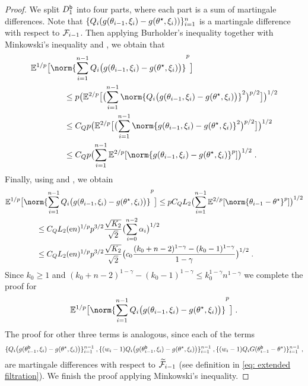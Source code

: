\begin{proof}
    We split \( D^{\mathsf{b}}_{1} \) into four parts, where each part is a sum of martingale differences.
    Note that $\{Q_i(g(\theta_{i-1},\xi_i)-g(\theta^\star,\xi_i))\}_{i=1}^{n}$ is a martingale difference with respect to $\mathcal{F}_{i-1}$.
    Then applying Burholder's inequality \cite[Theorem 8.6]{oskekowski2012sharp} together with Minkowski's inequality and , we obtain that 
    \begin{align}   
    &\PE^{1/p}\bigl[\norm{\sum_{i=1}^{n-1}Q_i\bigl(g(\theta_{i-1},\xi_i)-g(\thetas,\xi_i) \bigr)}^{p}\bigr] \\ 
    &\qquad \qquad \leq p\bigl(\PE^{2/p}\bigl[\bigl( \sum_{i=1}^{n-1}\norm{Q_i\bigl(g(\theta_{i-1},\xi_i)-g(\thetas,\xi_i) \bigr)}^2\bigr)^{p/2}\bigr]\bigr)^{1/2}
    \\ 
    &\qquad \qquad \leq C_Qp\bigl(\PE^{2/p}\bigl[\bigl( \sum_{i=1}^{n-1}\norm{g(\theta_{i-1},\xi_i)-g(\thetas,\xi_i)}^2\bigr)^{p/2}\bigr]\bigr)^{1/2}\\ 
    &\qquad \qquad \leq C_Qp\bigl(\sum_{i=1}^{n-1}\PE^{2/p}[\norm{g(\theta_{i-1},\xi_i)-g(\thetas,\xi_i) }^{p}]\bigr)^{1/2}\eqsp.
    \end{align}
Finally, using  and , we obtain 
\begin{align}
&\PE^{1/p}\bigl[\norm{\sum_{i=1}^{n-1}Q_i\bigl(g(\theta_{i-1},\xi_i)-g(\thetas,\xi_i) \bigr)}^{p}\bigr] \leq pC_QL_2\bigl(\sum_{i=1}^{n-1}\PE^{2/p}[\norm{\theta_{i-1} -\thetas}^{p}]\bigr)^{1/2}\\ 
& \qquad \qquad \leq  C_QL_2(\rme n)^{1/p}p^{3/2}\frac{\sqrt{K_2}}{\sqrt{2}}\bigl(\sum_{i=0}^{n-2}\alpha_i\bigr)^{1/2} \\
& \qquad \qquad \leq  C_QL_2(\rme n)^{1/p}p^{3/2}\frac{\sqrt{K_2}}{\sqrt{2}}\bigl(c_0\frac{(k_0+n-2)^{1-\gamma}-(k_0-1)^{1-\gamma}}{1-\gamma}\bigr)^{1/2}\eqsp.
\end{align}
Since $k_0 \geq 1$ and $(k_0+n-2)^{1-\gamma}-(k_0-1)^{1-\gamma}\leq k_0^{1-\gamma}n^{1-\gamma}$ we complete the proof for $$
\PE^{1/p}\bigl[\norm{\sum_{i=1}^{n-1}Q_i\bigl(g(\theta_{i-1},\xi_i)-g(\thetas,\xi_i) \bigr)}^{p}\bigr] \eqsp. 
$$
The proof for other three terms is analogous, since each of the terms 
\begin{align}
\{Q_i\bigl(g(\theta_{i-1}^{\mathsf{b}},\xi_i)-g(\theta^\star,\xi_i) \bigr)\}_{i=1}^{n-1}\;,\{(w_i-1)Q_i\bigl(g(\theta_{i-1}^{\mathsf{b}},\xi_i)-g(\theta^\star,\xi_i) \bigr)\}_{i=1}^{n-1}\;,
\{(w_i-1)Q_iG(\theta_{i-1}^{\mathsf{b}}-\theta^\star)\}_{i=1}^{n-1} \;,
\end{align}
are martingale differences with respect to $\widetilde{\mathcal{F}}_{i-1}$ (see definition in \eqref{eq: extended filtration}). 
We finish the proof applying Minkowski's inequality.
\end{proof}

